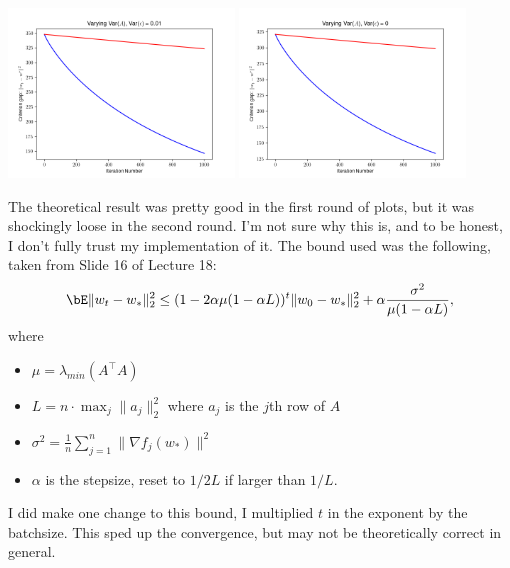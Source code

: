 \begin{homework}[e]
\begin{prf}
\begin{center}
      \bigskip

      \includegraphics[width=0.45\textwidth]{figures/graph7.png}
      \includegraphics[width=0.45\textwidth]{figures/graph8.png}
    \end{center}
    The theoretical result was pretty good in the first round of plots, but it was shockingly loose in the second round. I'm not sure why this is, and to be honest, I don't fully trust my implementation of it. The bound used was the following, taken from Slide 16 of Lecture 18:
    \begin{align*}
      \bE\|w_t - w_*\|^2_2 \leq (1 - 2\alpha \mu(1 - \alpha L))^t \|w_0 - w_*\|^2_2 + \alpha \frac{\sigma^2}{\mu(1 - \alpha L)},
    \end{align*}
    where
    \begin{itemize}
      \item $\mu = \lambda_{min}(A^\top A)$
      \item $L = n\cdot \max_j \|a_j\|^2_2$ where $a_j$ is the $j$th row of $A$
      \item $\sigma^2 =\frac{1}{n}\sum_{j=1}^n \|\nabla f_j(w_*)\|^2 $
      \item $\alpha$ is the stepsize, reset to $1/2L$ if larger than $1/L$.
    \end{itemize}
    I did make one change to this bound, I multiplied $t$ in the exponent by the batchsize. This sped up the convergence, but may not be theoretically correct in general.


\end{prf}
\end{homework}
